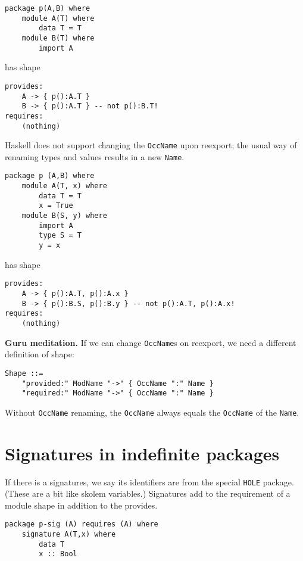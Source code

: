 \documentclass{article}
\newenvironment{aside}
  {\begin{mdframed}[style=0,%
      leftline=false,rightline=false,leftmargin=2em,rightmargin=2em,%
          innerleftmargin=0pt,innerrightmargin=0pt,linewidth=0.75pt,%
      skipabove=7pt,skipbelow=7pt]\small}
  {\end{mdframed}}
\begin{document}
\begin{verbatim}
package p(A,B) where
    module A(T) where
        data T = T
    module B(T) where
        import A
\end{verbatim}

has shape

\begin{verbatim}
provides:
    A -> { p():A.T }
    B -> { p():A.T } -- not p():B.T!
requires:
    (nothing)
\end{verbatim}

Haskell does not support changing the \verb|OccName| upon reexport;
the usual way of renaming types and values results in a new \verb|Name|.

\begin{verbatim}
package p (A,B) where
    module A(T, x) where
        data T = T
        x = True
    module B(S, y) where
        import A
        type S = T
        y = x
\end{verbatim}

has shape

\begin{verbatim}
provides:
    A -> { p():A.T, p():A.x }
    B -> { p():B.S, p():B.y } -- not p():A.T, p():A.x!
requires:
    (nothing)
\end{verbatim}

\begin{aside}
\textbf{Guru meditation.}  If we can change \verb|OccName|s on reexport,
we need a different definition of shape:
\begin{verbatim}
Shape ::=
    "provided:" ModName "->" { OccName ":" Name }
    "required:" ModName "->" { OccName ":" Name }
\end{verbatim}

Without \verb|OccName| renaming, the \verb|OccName| always equals
the \verb|OccName| of the \verb|Name|.
\end{aside}

\section{Signatures in indefinite packages}

If there is a signatures, we say its identifiers are from the special
\verb|HOLE| package.  (These are a bit like skolem variables.)
Signatures add to the requirement of a module shape
in addition to the provides.

\begin{verbatim}
package p-sig (A) requires (A) where
    signature A(T,x) where
        data T
        x :: Bool
\end{verbatim}
\end{document}
